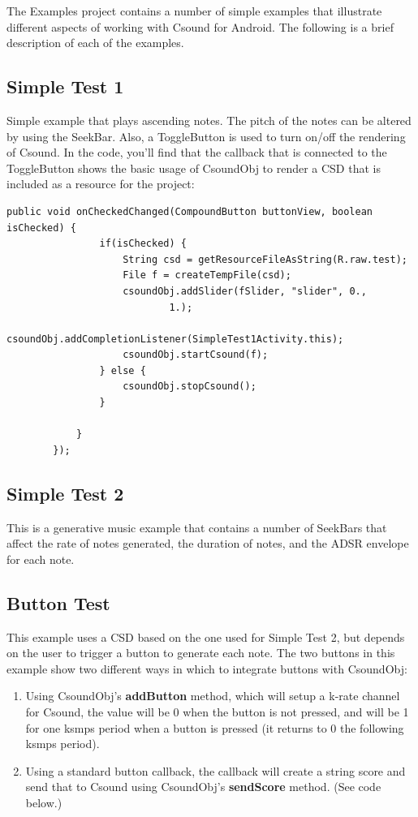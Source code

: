 \documentclass[11pt]{article}
\begin{document}
The Examples project contains a number of simple examples that illustrate different aspects of working with Csound for Android.  The following is a brief description of each of the examples.

\subsection{Simple Test 1}

Simple example that plays ascending notes.  The pitch of the notes can be altered by using the SeekBar.  Also, a ToggleButton is used to turn on/off the rendering of Csound.  In the code, you'll find that the callback that is connected to the ToggleButton shows the basic usage of CsoundObj to render a CSD that is included as a resource for the project:

\begin{lstlisting}[caption=Example code showing configuring and starting a CsoundObj]
public void onCheckedChanged(CompoundButton buttonView, boolean isChecked) {
				if(isChecked) {
					String csd = getResourceFileAsString(R.raw.test);
					File f = createTempFile(csd);
					csoundObj.addSlider(fSlider, "slider", 0.,
							1.);
					csoundObj.addCompletionListener(SimpleTest1Activity.this);
					csoundObj.startCsound(f);
				} else {
					csoundObj.stopCsound();
				}
				
			}
		});
\end{lstlisting}

\subsection{Simple Test 2}

This is a generative music example that contains a number of SeekBars that affect the rate of notes generated, the duration of notes, and the ADSR envelope for each note. 


\subsection{Button Test}

This example uses a CSD based on the one used for Simple Test 2, but depends on the user to trigger a button to generate each note.  The two buttons in this example show two different ways in which to integrate buttons with CsoundObj:

\begin{enumerate}
\item Using CsoundObj's \textbf{addButton} method, which will setup a k-rate channel for Csound, the value will be 0 when the button is not pressed, and will be 1 for one ksmps period when a button is pressed (it returns to 0 the following ksmps period). 
\item Using a standard button callback, the callback will create a string score and send that to Csound using CsoundObj's \textbf{sendScore} method. (See code below.)
\end{enumerate}
\end{document}
